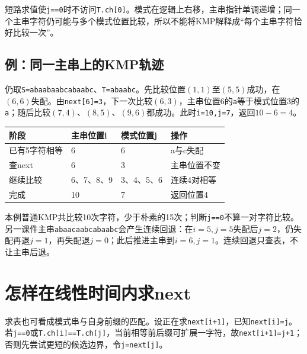 短路求值使\texttt{j=\allowbreak{}=\allowbreak{}0}时不访问\texttt{T.\allowbreak{}ch[\allowbreak{}0]\allowbreak{}}。模式在逻辑上右移，主串指针单调递增；同一个主串字符仍可能与多个模式位置比较，所以不能将KMP解释成``每个主串字符恰好比较一次''。

\subsection{例：同一主串上的KMP轨迹}\label{DS04-kmp-example}

仍取\texttt{S=\allowbreak{}abaabaabcabaabc}、\texttt{T=\allowbreak{}abaabc}。先比较位置\((1,1)\)至\((5,5)\)成功，在\((6,6)\)失配。由\texttt{next[\allowbreak{}6]\allowbreak{}=\allowbreak{}3}，下一次比较\((6,3)\)，主串位置6的\texttt{a}等于模式位置3的\texttt{a}；随后比较\((7,4)\)、\((8,5)\)、\((9,6)\)都成功。此时\texttt{i=\allowbreak{}10,\allowbreak{}j=\allowbreak{}7}，返回\(10-6=4\)。

\begin{wideblock}\par\medskip\noindent\begin{minipage}{\linewidth}\fontsize{9.3}{12}\selectfont\begin{tabularx}{\linewidth}{@{}YYYY@{}}
\toprule\noalign{}
阶段 & 主串位置i & 模式位置j & 操作 \\
\midrule\noalign{}


已有5字符相等 & 6 & 6 & a与c失配 \\
查next & 6 & 3 & 主串位置不变 \\
继续比较 & 6、7、8、9 & 3、4、5、6 & 连续4对相等 \\
完成 & 10 & 7 & 返回位置4 \\
\bottomrule\end{tabularx}
\end{minipage}\par\medskip\end{wideblock}

本例普通KMP共比较10次字符，少于朴素的15次；判断\texttt{j=\allowbreak{}=\allowbreak{}0}不算一对字符比较。另一课件主串\texttt{abaacaabcabaabc}会产生连续回退：在\(i=5,j=5\)失配后\(j=2\)，仍失配再退\(j=1\)，再失配退\(j=0\)；此后推进主串到\(i=6,j=1\)。连续回退只查表，不让主串后退。

\section{怎样在线性时间内求next}\label{DS04-next}

求表也可看成模式串与自身前缀的匹配。设正在求\texttt{next[\allowbreak{}i+\allowbreak{}1]\allowbreak{}}，已知\texttt{next[\allowbreak{}i]\allowbreak{}=\allowbreak{}j}。若\texttt{j=\allowbreak{}=\allowbreak{}0}或\texttt{T.\allowbreak{}ch[\allowbreak{}i]\allowbreak{}=\allowbreak{}=\allowbreak{}T.\allowbreak{}ch[\allowbreak{}j]\allowbreak{}}，当前相等前后缀可扩展一字符，故\texttt{next[\allowbreak{}i+\allowbreak{}1]\allowbreak{}=\allowbreak{}j+\allowbreak{}1}；否则先尝试更短的候选边界，令\texttt{j=\allowbreak{}next[\allowbreak{}j]\allowbreak{}}。

